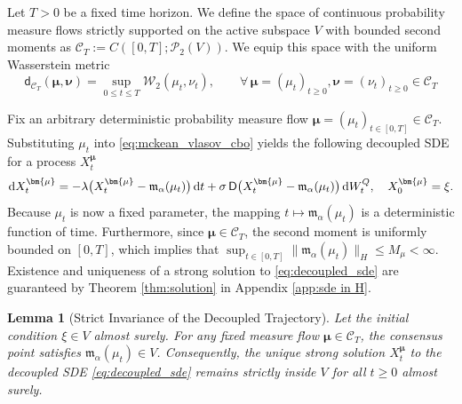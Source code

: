 \documentclass[12pt]{amsart}
\newcommand{\D}[1]{\mbox{\rm #1}}
\newcommand{\dd}{\D{d}}
\numberwithin{equation}{section}
\newtheorem{lemma}[theorem]{Lemma}
\begin{document}
Let $T > 0$ be a fixed time horizon. We define the space of continuous probability measure flows strictly supported on the active subspace $V$ with bounded second moments as $\mathscr{C}_T := C([0,T]; \mathscr{P}_2(V))$. 
We equip this space with the uniform Wasserstein metric 
\begin{equation*}
    \mathsf{d}_{\mathscr{C}_T}(\bm{\mu}, \bm{\nu}) = \sup_{0 \leq t \leq T} \mathcal{W}_2(\mu_t, \nu_t), \qquad \forall\, \bm{\mu}=(\mu_t)_{t\geq 0}, \bm{\nu} = (\nu_{t})_{t\geq 0} \in \mathscr{C}_T
\end{equation*}

Fix an arbitrary deterministic probability measure flow $\bm{\mu} = (\mu_t)_{t \in [0,T]} \in \mathscr{C}_T$. Substituting $\mu_t$ into \eqref{eq:mckean_vlasov_cbo} yields the following decoupled SDE for a process $X^{\bm{\mu}}_t$
\begin{equation}
    \label{eq:decoupled_sde}
    \dd X^{\bm{\mu}}_t = -\lambda \big(X^{\bm{\mu}}_t - \mathfrak{m}_\alpha(\mu_t)\big)\,\dd t + \sigma\, \mathsf{D}\big(X^{\bm{\mu}}_t - \mathfrak{m}_\alpha(\mu_t)\big)\, \dd W_t^Q, \quad X^{\bm{\mu}}_0 = \xi.
\end{equation}
Because $\mu_t$ is now a fixed parameter, the mapping $t \mapsto \mathfrak{m}_\alpha(\mu_t)$ is a deterministic function of time. Furthermore, since $\bm{\mu} \in \mathscr{C}_T$, the second moment is uniformly bounded on $[0,T]$, which implies that $\sup_{t \in [0,T]} \|\mathfrak{m}_\alpha(\mu_t)\|_H \leq M_\mu < \infty$. Existence and uniqueness of a strong solution to \eqref{eq:decoupled_sde} are guaranteed by Theorem \ref{thm:solution} in Appendix \ref{app:sde in H}.
\begin{lemma}[Strict Invariance of the Decoupled Trajectory] \label{lem:subspace_invariance}
Let the initial condition $\xi \in V$ almost surely. For any fixed measure flow $\bm{\mu} \in \mathscr{C}_{T}$, the consensus point satisfies $\mathfrak{m}_\alpha(\mu_t) \in V$. Consequently, the unique strong solution $X^{\bm{\mu}}_t$ to the decoupled SDE \eqref{eq:decoupled_sde} remains strictly inside $V$ for all $t \geq 0$ almost surely.
\end{lemma}
\end{document}
